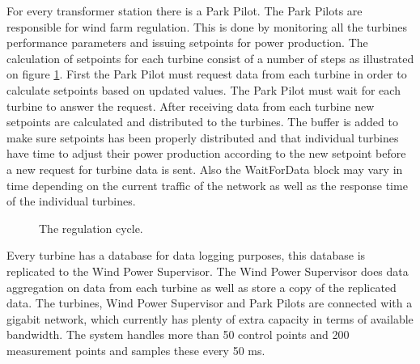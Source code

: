 For every transformer station there is a Park Pilot. The Park Pilots are responsible for wind farm regulation. This is done by monitoring all the turbines performance parameters and issuing setpoints for power production. The calculation of setpoints for each turbine consist of a number of steps as illustrated on figure \cref{fig:currentSiemensCycleTime}. First the Park Pilot must request data from each turbine in order to calculate setpoints based on updated values. The Park Pilot must wait for each turbine to answer the request. After receiving data from each turbine new setpoints are calculated and distributed to the turbines. The buffer is added to make sure setpoints has been properly distributed and that individual turbines have time to adjust their power production according to the new setpoint before a new request for turbine data is sent. Also the WaitForData block may vary in time depending on the current traffic of the network as well as the response time of the individual turbines.

\begin{figure}[!h]
	\centering
	
	\caption[The current Siemens wind farm system overview]{
		\label{fig:currentSiemensCycleTime} 
		\footnotesize{%
			The regulation cycle.
		}
	}
\end{figure}

Every turbine has a database for data logging purposes, this database is replicated to the Wind Power Supervisor.
The Wind Power Supervisor does data aggregation on data from each turbine as well as store a copy of the replicated data.
The turbines, Wind Power Supervisor and Park Pilots are connected with a gigabit network, which currently has plenty of extra capacity in terms of available bandwidth.
The system handles more than 50 control points and 200 measurement points and samples these every 50 ms.

